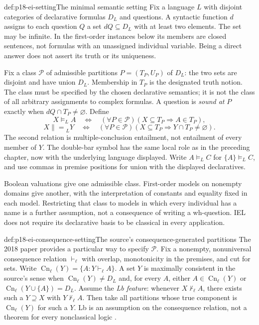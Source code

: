 \begin{hbdefinition}{def:p18-ei-setting}{The minimal semantic setting}
Fix a language \(L\) with disjoint categories of declarative formulas
\(D_L\) and questions. A syntactic function \(d\) assigns to each question
\(Q\) a set \(dQ\subseteq D_L\) with at least two elements. The set may
be infinite. In the first-order instances below its members are closed
sentences, not formulas with an unassigned individual variable. Being a
direct answer does not assert its truth or its uniqueness.

Fix a class \(\mathcal P\) of admissible partitions
\(P=(T_P,U_P)\) of \(D_L\): the two sets are disjoint and have union
\(D_L\). Membership in \(T_P\) is the designated truth notion. The class
must be specified by the chosen declarative semantics; it is not the class
of all arbitrary assignments to complex formulas. A question is
\emph{sound at} \(P\) exactly when \(dQ\cap T_P\ne\varnothing\).
Define
\[
 X\models_L A\quad\Longleftrightarrow\quad
 (\forall P\in\mathcal P)(X\subseteq T_P\Rightarrow A\in T_P),
\]
\[
 X\mathrel{\|=}_L Y\quad\Longleftrightarrow\quad
 (\forall P\in\mathcal P)(X\subseteq T_P\Rightarrow Y\cap T_P\ne\varnothing).
\]
The second relation is multiple-conclusion entailment, not entailment of
every member of \(Y\). The double-bar symbol has the same local role as
in the preceding chapter, now with the underlying language displayed.
Write \(A\models_L C\) for \(\{A\}\models_L C\), and use commas
in premise positions for union with the displayed declaratives.
\end{hbdefinition}

Boolean valuations give one admissible class. First-order models on nonempty
domains give another, with the interpretation of constants and equality fixed
in each model. Restricting that class to models in which every individual has
a name is a further assumption, not a consequence of writing a wh-question.
IEL does not require its declarative basis to be classical in every application.

\begin{hbdefinition}{def:p18-ei-consequence-setting}{The source's consequence-generated partitions}
The 2018 paper provides a particular way to specify \(\mathcal P\). Fix a
nonempty, nonuniversal consequence relation \(\vdash_\ell\) with overlap,
monotonicity in the premises, and cut for sets. Write
\(\operatorname{Cn}_\ell(Y)=\{A:Y\vdash_\ell A\}\).
A set \(Y\) is maximally consistent in the source's sense when
\(\operatorname{Cn}_\ell(Y)\ne D_L\) and, for every \(A\), either
\(A\in\operatorname{Cn}_\ell(Y)\) or
\(\operatorname{Cn}_\ell(Y\cup\{A\})=D_L\).
Assume the \emph{Lb feature}: whenever \(X\not\vdash_\ell A\), there
exists such a \(Y\supseteq X\) with \(Y\not\vdash_\ell A\).
Then take all partitions whose true component is
\(\operatorname{Cn}_\ell(Y)\) for such a \(Y\).
Lb is an assumption on the consequence relation, not a theorem for every
nonclassical logic \cite[pp.~298--300]{Wisniewski2018DeductionReduction}.
\end{hbdefinition}

